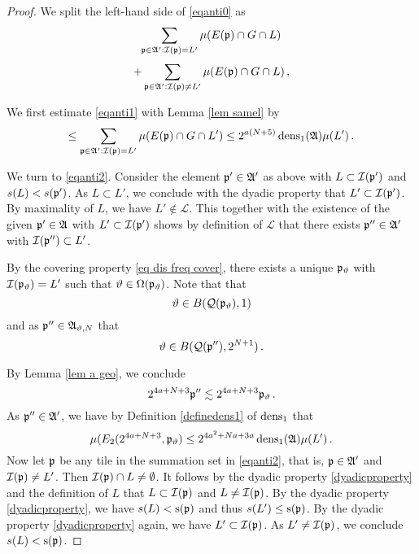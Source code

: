 \begin{proof}
We split the left-hand side of \eqref{eqanti0} as
\begin{equation}\label{eqanti1}
    \sum_{\mathfrak p\in\mathfrak{A}':\mathcal{I}(\mathfrak p)=L'}\mu(E(\mathfrak p)\cap G\cap L)
\end{equation}
\begin{equation}\label{eqanti2}
    +
        \sum_{\mathfrak p\in\mathfrak{A}':\mathcal{I}(\mathfrak p)\neq L'}\mu(E(\mathfrak p)\cap G\cap L)\, ,
\end{equation}

We first estimate \eqref{eqanti1}
with Lemma \ref{lem samel} by
\begin{equation}\label{equanti1.5}
    \le \sum_{\mathfrak p\in\mathfrak{A}':\mathcal{I}(\mathfrak p)=L'}\mu(E(\mathfrak p)\cap G\cap L')\le 2^{a(N+5)}\operatorname{\operatorname{dens}}_1(\mathfrak{A})\mu(L')\, .
\end{equation}



We turn to \eqref{eqanti2}.
Consider the element $\mathfrak p'\in \mathfrak{A}'$ as above
with $L\subset \mathcal{I}(\mathfrak p')$ and $s(L)<s(\mathfrak p')$.
As $L\subset L'$, we conclude with the dyadic property that $L'\subset \mathcal{I}(\mathfrak p')$.
By maximality of $L$, we have
$L'\not\in \mathcal{L}$.
This together with the existence of the given $\mathfrak p'\in \mathfrak{A}$
with $L'\subset \mathcal{I}(\mathfrak p')$
shows by definition of $\mathcal{L}$ that there exists $\mathfrak p''\in \mathfrak{A}'$ with
$\mathcal{I}(\mathfrak p'')\subset L'$.




By the covering property \eqref{eq dis freq cover}, there exists a unique $\mathfrak p_{\vartheta}$ with $\mathcal{I}(\mathfrak p_{\vartheta})=L'$
such that $\vartheta\in \Omega(\mathfrak p_{\vartheta})$.
Note that
that
\begin{equation}
    \vartheta\in B(\mathcal{Q}(\mathfrak p_{\vartheta}), 1)
\end{equation}
and as  $\mathfrak p'' \in \mathfrak{A}_{\vartheta,N}$ that
\begin{equation}
    \vartheta \in B(\mathcal{Q}(\mathfrak p''), 2^{N+1})\, .
\end{equation}


By Lemma \ref{lem a geo}, we conclude
\begin{equation}
        2^{4a+N+3}\mathfrak p''  \lesssim  2^{4a+N+3}\mathfrak p_{\vartheta} \, .
    \end{equation}
As $\mathfrak p''\in \mathfrak{A}'$, we have by Definition
\eqref{definedens1} of $\operatorname{\operatorname{dens}}_1$ that
\begin{equation}\label{pmfadens}
    {\mu(E_2(2^{4a+N+3}, \mathfrak p_{\vartheta})}\le 2^{4a^2+Na+3a}\operatorname{\operatorname{dens}}_1(\mathfrak{A}) {\mu(L')}\, .
\end{equation}
Now let $\mathfrak p$ be any tile in the summation set in \eqref{eqanti2}, that is, $\mathfrak p\in \mathfrak{A}'$ and $\mathcal{I}(\mathfrak p)\neq L'$.
Then $\mathcal{I}(\mathfrak p)\cap L\neq \emptyset$. It follows by the dyadic property \eqref{dyadicproperty}
and the definition of $L$ that
$L\subset \mathcal{I}(\mathfrak p)$ and $L\neq \mathcal{I}(\mathfrak p)$. By the dyadic property \eqref{dyadicproperty}, we have
$s(L)<\mathrm{s}(\mathfrak p)$ and thus $s(L')\le \mathrm{s}(\mathfrak p)$. By the dyadic property
    \eqref{dyadicproperty} again, we have $L'\subset \mathcal{I}(\mathfrak p)$.
As $L'\neq \mathcal{I}(\mathfrak p)$, we conclude $s(L)<\mathrm{s}(\mathfrak p)$.





\end{proof}
